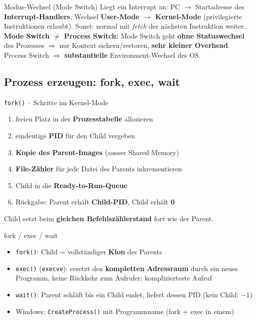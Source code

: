\documentclass[a4paper, fontsize=7pt]{scrartcl}
\begin{document}
\begin{mainbox}{Modus-Wechsel (Mode Switch)}
Liegt ein Interrupt an: PC $\to$ Startadresse des
\textbf{Interrupt-Handlers}, Wechsel \textbf{User-Mode $\to$
Kernel-Mode} (privilegierte Instruktionen erlaubt). Sonst: normal mit
\emph{fetch} der nächsten Instruktion weiter.\\
\textbf{Mode Switch $\neq$ Process Switch:} Mode Switch geht \textbf{ohne
Statuswechsel} des Prozesses $\Rightarrow$ nur Kontext sichern/restoren,
\textbf{sehr kleiner Overhead}. Process Switch $\Rightarrow$
\textbf{substantielle} Environment-Wechsel des OS.
\end{mainbox}

\subsection{Prozess erzeugen: fork, exec, wait}

\begin{mainbox}{\texttt{fork()} -- Schritte im Kernel-Mode}
\begin{enumerate}
    \item freien Platz in der \textbf{Prozesstabelle} allozieren
    \item eindeutige \textbf{PID} für den Child vergeben
    \item \textbf{Kopie des Parent-Images} (ausser Shared Memory)
    \item \textbf{File-Zähler} für jede Datei des Parents inkrementieren
    \item Child in die \textbf{Ready-to-Run-Queue}
    \item Rückgabe: Parent erhält \textbf{Child-PID}, Child erhält
          \textbf{0}
\end{enumerate}
Child setzt beim \textbf{gleichen Befehlszählerstand} fort wie der Parent.
\end{mainbox}

\begin{mainbox}{fork / exec / wait}
\begin{itemize}
    \item \texttt{fork()}: Child = vollständiger \textbf{Klon} des Parents
    \item \texttt{exec()} (\texttt{execve}): ersetzt den
          \textbf{kompletten Adressraum} durch ein neues Programm, keine
          Rückkehr zum Aufrufer; komplizierteste Aufruf
    \item \texttt{wait()}: Parent schläft bis ein Child endet, liefert
          dessen PID (kein Child: $-1$)
    \item Windows: \texttt{CreateProcess()} mit Programmname (fork + exec
          in einem)
\end{itemize}
\end{mainbox}
\end{document}
